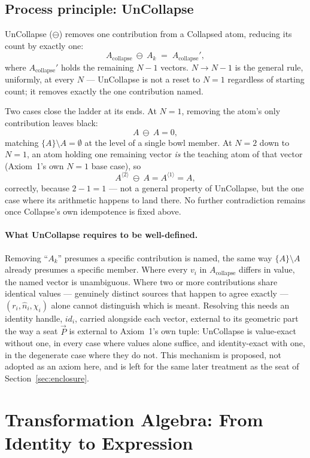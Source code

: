 \documentclass[12pt, a4paper]{article}
\begin{document}
\subsection{Process principle: UnCollapse}

UnCollapse ($\ominus$) removes one contribution from a Collapsed
atom, reducing its count by exactly one:
\[
A_{\text{collapse}}\ \ominus\ A_k \;=\; A_{\text{collapse}}',
\]
where $A_{\text{collapse}}'$ holds the remaining $N-1$ vectors.
$N\to N-1$ is the general rule, uniformly, at every $N$ --- UnCollapse
is not a reset to $N=1$ regardless of starting count; it removes
exactly the one contribution named.

Two cases close the ladder at its ends. At $N=1$, removing the atom's
only contribution leaves black:
\[
A\ \ominus\ A = 0,
\]
matching $\{A\}\setminus A=\emptyset$ at the level of a single bowl
member. At $N=2$ down to $N=1$, an atom holding one remaining vector
\emph{is} the teaching atom of that vector (Axiom~1's own $N=1$ base
case), so
\[
A^{\langle 2\rangle}\ \ominus\ A = A^{\langle 1\rangle} = A,
\]
correctly, because $2-1=1$ --- not a general property of UnCollapse,
but the one case where its arithmetic happens to land there. No
further contradiction remains once Collapse's own idempotence is
fixed above.

\paragraph{What UnCollapse requires to be well-defined.} Removing
``$A_k$'' presumes a specific contribution is named, the same way
$\{A\}\setminus A$ already presumes a specific member. Where every
$v_i$ in $A_{\text{collapse}}$ differs in value, the named vector is
unambiguous. Where two or more contributions share identical values
--- genuinely distinct sources that happen to agree exactly ---
$(r_i,\hat n_i,\chi_i)$ alone cannot distinguish which is meant.
Resolving this needs an identity handle, $id_i$, carried alongside
each vector, external to its geometric part the way a seat $\vec P$
is external to Axiom~1's own tuple: UnCollapse is value-exact without
one, in every case where values alone suffice, and identity-exact
with one, in the degenerate case where they do not. This mechanism is
proposed, not adopted as an axiom here, and is left for the same
later treatment as the seat of Section~\ref{sec:enclosure}.


\section{Transformation Algebra: From Identity to Expression}
\label{sec:transformation_algebra}
\end{document}
